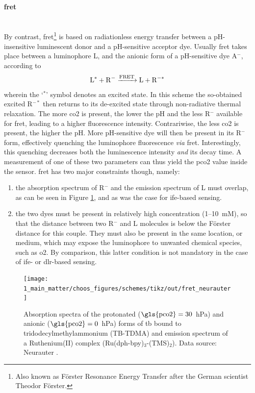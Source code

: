 \paragraph{\texorpdfstring{\gls{fret}}{FRET}}\mbox{}\\

By contrast, \gls{fret}\footnote{Also known as Förster Resonance Energy Transfer after the German scientist Theodor Förster\cite{forster1948}.} is based on radiationless energy transfer between a pH-insensitive luminescent donor and a pH-sensitive acceptor dye. Usually \gls{fret} takes place between a luminophore L, and the anionic form of a pH-sensitive dye A$^-$, according to
\begin{equation}
	\ce{L^* + R^- ->[FRET] L + R^{-*}}
\end{equation}
wherein the `$^*$' symbol denotes an excited state. In this scheme the so-obtained excited R$^{-*}$ then returns to its de-excited state through non-radiative thermal relaxation. The more \gls{co2} is present, the lower the pH and the less R$^-$ available for \gls{fret}, leading to a higher fluorescence intensity. Contrariwise, the less \gls{co2} is present, the higher the pH. More pH-sensitive dye will then be present in its R$^-$ form, effectively quenching the luminophore fluorescence \textit{via} \gls{fret}. Interestingly, this quenching decreases both the luminescence intensity \emph{and} its decay time. A measurement of one of these two parameters can thus yield the \gls{pco2} value inside the sensor. \gls{fret} has two major constraints though, namely:
\begin{enumerate}
	\item the absorption spectrum of R$^-$ and the emission spectrum of L must overlap, as can be seen in Figure \ref{fig:choos:dye_based:advanced:fret_ex}, and as was the case for \gls{ife}-based sensing.
	\item the two dyes must be present in relatively high concentration (1--10~mM), so that the distance between two R$^-$ and L molecules is below the Förster distance for this couple. They must also be present in the same location, or medium, which may expose the luminophore to unwanted chemical species, such as \gls{o2}. By comparison, this latter condition is not mandatory in the case of \gls{ife}- or \gls{dlr}-based sensing.
\end{enumerate}

\begin{figure}
	\centering
	\texttt{[image: 1\_main\_matter/choos\_figures/schemes/tikz/out/fret\_neurauter]}
	\caption[\gls{fret} scheme example.]{Absorption spectra of the protonated ($\text{\gls{pco2}}=30$~hPa) and anionic ($\text{\gls{pco2}}=0$~hPa) forms of \gls{tb} bound to tridodecylmethylammonium (TB-TDMA) and emission spectrum of a Ruthenium(II) complex (Ru(dph-bpy)$_3$-(TMS)$_2$). Data source: Neurauter \etal{}\cite{neurauter1999}.}
	\label{fig:choos:dye_based:advanced:fret_ex}
\end{figure}

